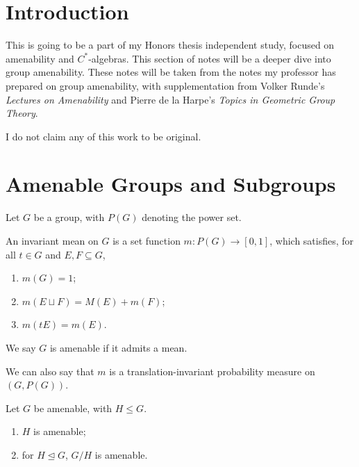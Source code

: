 \documentclass[10pt]{mypackage}
\begin{document}
\RaggedRight
\tableofcontents
\section{Introduction}%
This is going to be a part of my Honors thesis independent study, focused on amenability and $C^{\ast}$-algebras. This section of notes will be a deeper dive into group amenability. These notes will be taken from the notes my professor has prepared on group amenability, with supplementation from Volker Runde's \textit{Lectures on Amenability} and Pierre de la Harpe's \textit{Topics in Geometric Group Theory}.\newline

I do not claim any of this work to be original.
\section{Amenable Groups and Subgroups}%
Let $G$ be a group, with $P(G)$ denoting the power set.
\begin{definition}
  An invariant mean on $G$ is a set function $m: P(G)\rightarrow [0,1]$, which satisfies, for all $t\in G$ and $E,F\subseteq G$,
  \begin{enumerate}[(1)]
    \item $m(G) = 1$;
    \item $m\left(E\sqcup F\right) = M(E) + m(F)$;
    \item $m\left(tE\right) = m\left(E\right)$.
  \end{enumerate}
  We say $G$ is amenable if it admits a mean.\newline

  We can also say that $m$ is a translation-invariant probability measure on $\left(G,P(G)\right)$.
\end{definition}
\begin{proposition}
  Let $G$ be amenable, with $H\leq G$.
  \begin{enumerate}[(1)]
    \item $H$ is amenable;
    \item for $H\trianglelefteq G$, $G/H$ is amenable.
  \end{enumerate}
\end{proposition}
\end{document}
